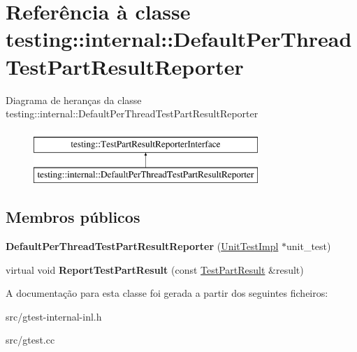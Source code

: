 \hypertarget{classtesting_1_1internal_1_1DefaultPerThreadTestPartResultReporter}{\section{Referência à classe testing\-:\-:internal\-:\-:Default\-Per\-Thread\-Test\-Part\-Result\-Reporter}
\label{classtesting_1_1internal_1_1DefaultPerThreadTestPartResultReporter}
}
Diagrama de heranças da classe testing\-:\-:internal\-:\-:Default\-Per\-Thread\-Test\-Part\-Result\-Reporter\begin{figure}[H]
\begin{center}
\leavevmode
\includegraphics[height=2.000000cm]{classtesting_1_1internal_1_1DefaultPerThreadTestPartResultReporter}
\end{center}
\end{figure}
\subsection*{Membros públicos}
\begin{DoxyCompactItemize}
\item 
\hypertarget{classtesting_1_1internal_1_1DefaultPerThreadTestPartResultReporter_a968a846e5a90d2ffea8b2ce2746099bd}{{\bfseries Default\-Per\-Thread\-Test\-Part\-Result\-Reporter} (\hyperlink{classtesting_1_1internal_1_1UnitTestImpl}{Unit\-Test\-Impl} $\ast$unit\-\_\-test)}\label{classtesting_1_1internal_1_1DefaultPerThreadTestPartResultReporter_a968a846e5a90d2ffea8b2ce2746099bd}

\item 
\hypertarget{classtesting_1_1internal_1_1DefaultPerThreadTestPartResultReporter_ac6dc08eadc4e5a2a64a91d0b6c6b3aad}{virtual void {\bfseries Report\-Test\-Part\-Result} (const \hyperlink{classtesting_1_1TestPartResult}{Test\-Part\-Result} \&result)}\label{classtesting_1_1internal_1_1DefaultPerThreadTestPartResultReporter_ac6dc08eadc4e5a2a64a91d0b6c6b3aad}

\end{DoxyCompactItemize}


A documentação para esta classe foi gerada a partir dos seguintes ficheiros\-:\begin{DoxyCompactItemize}
\item 
src/gtest-\/internal-\/inl.\-h\item 
src/gtest.\-cc\end{DoxyCompactItemize}
